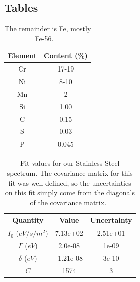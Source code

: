\documentclass[reprint, nobibnotes, amssymb, amsmath, amsfonts, mathtools, mathrsfs, floatfix]{revtex4-1}
\begin{document}
    \subsection{Tables}
      \begin{table}[h]
        \centering
        \begin{tabular}{|c|c|}
          \hline
          Element & Content (\%) \\ \hline
          Cr & 17-19 \\ \hline
          Ni & 8-10 \\ \hline
          Mn & 2 \\ \hline
          Si & 1.00 \\ \hline
          C & 0.15 \\ \hline
          S & 0.03 \\ \hline
          P & 0.045 \\ \hline
        \end{tabular}
        \caption{The remainder is Fe, mostly Fe-56.~\cite{stainless_chemical_makeup}~\label{tab:SS_chemical_makeup}}
      \end{table}

      \begin{table}[h]
        \centering
        \begin{tabular}{|c|c|c|}
          \hline
          Quantity & Value & Uncertainty \\ \hline \hline
          $I_0$ ($eV/s/m^2$) & 7.13e+02 & 2.51e+01 \\ \hline \hline
          $\Gamma$ ($eV$) & 2.0e-08 & 1e-09 \\ \hline \hline
          $\delta$ ($eV$) & -1.21e-08 & 3e-10 \\ \hline \hline
          $C$ & 1574 & 3 \\ \hline
        \end{tabular}
        \caption{Fit values for our Stainless Steel spectrum.  The covariance matrix for this fit was well-defined, so the uncertainties on this fit simply come from the diagonals of the covariance matrix.~\label{tab:ss_fit_stats}}
      \end{table}
\end{document}
